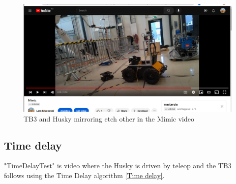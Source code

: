 \begin{figure}[H]
    \centering
    \includegraphics[width=\textwidth]{Figures/YouTube/Mimic.png}
    \caption{TB3 and Husky mirroring etch other in the Mimic video}
    \label{fig:Mimic}
\end{figure}

\subsection{Time delay}

"TimeDelayTest" is video where the Husky is driven by teleop and the TB3 follows using the Time Delay algorithm \ref{Time delay}. 


